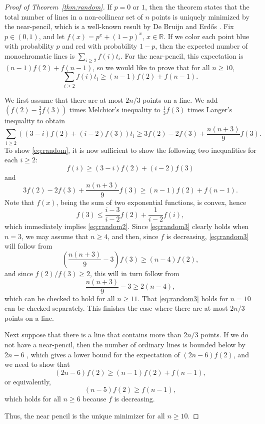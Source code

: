 \documentclass[a4paper,11pt,leqno]{article}
\begin{document}
\begin{proof}[Proof of Theorem~\ref{thm:random}]
If $p=0$ or $1$, then the theorem states that the total number of lines in a non-collinear set of $n$ points is uniquely minimized by the near-pencil, which is a well-known result by De Bruijn and Erd\H{o}s \cite{dBE48}.
Fix $p\in(0,1)$, and let $f(x)=p^x+(1-p)^x$, $x\in\mathbb{R}$.
If we color each point blue with probability $p$ and red with probability $1-p$, then the expected number of monochromatic lines is $\sum_{i\geq 2} f(i)t_i$.
For the near-pencil, this expectation is $(n-1)f(2)+f(n-1)$,
so we would like to prove that for all $n\geq 10$,
\begin{equation}\label{eq:random}
\sum_{i\geq 2} f(i)t_i\geq (n-1)f(2)+f(n-1).
\end{equation}

We first assume that there are at most $2n/3$ points on a line.
We add $(f(2)-\frac23f(3))$ times Melchior's inequality to $\frac13f(3)$ times Langer's inequality to obtain
\[\sum_{i\geq 2} ((3-i)f(2)+(i-2)f(3))t_i\geq 3f(2)-2f(3)+\frac{n(n+3)}{9}f(3).\]
To show \eqref{eq:random}, it is now sufficient to show the following two inequalities for each $i\geq 2$:
\begin{equation}\label{eq:random2}
f(i) \geq (3-i)f(2)+(i-2)f(3)
\end{equation}
and
\begin{equation}\label{eq:random3}
3f(2)-2f(3)+\frac{n(n+3)}{9}f(3) \geq (n-1)f(2)+f(n-1).
\end{equation}
Note that $f(x)$, being the sum of two exponential functions, is convex, hence
\[ f(3) \leq \frac{i-3}{i-2}f(2)+\frac{1}{i-2} f(i),\]
which immediately implies \eqref{eq:random2}.
Since \eqref{eq:random3} clearly holds when $n=3$, we may assume that $n\geq 4$, and then, since $f$ is decreasing, \eqref{eq:random3} will follow from 
\[\left(\frac{n(n+3)}{9}-3\right)f(3) \geq (n-4)f(2),\]
and since $f(2)/f(3)\geq 2$, this will in turn follow from 
\[ \frac{n(n+3)}{9}-3 \geq 2(n-4),\]
which can be checked to hold for all $n\geq 11$.
That \eqref{eq:random3} holds for $n=10$ can be checked separately.
This finishes the case where there are at most $2n/3$ points on a line.

Next suppose that there is a line that contains more than $2n/3$ points.
If we do not have a near-pencil, then the number of ordinary lines is bounded below by $2n-6$ \cite[Lemma 1]{erdospurdy1978}, which gives a lower bound for the expectation of $(2n-6)f(2)$, and we need to show that
\[ (2n-6)f(2)\geq (n-1)f(2) + f(n-1),\]
or equivalently,
\[ (n-5)f(2)\geq f(n-1),\]
which holds for all $n\geq 6$ because $f$ is decreasing.

Thus, the near pencil is the unique minimizer for all $n\geq 10$.
\end{proof}
\end{document}
